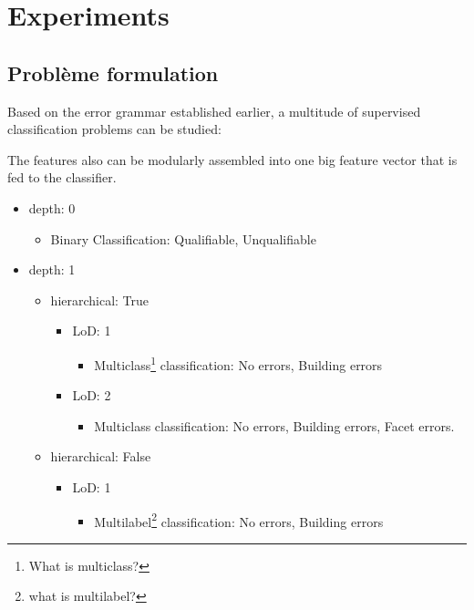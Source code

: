 \documentclass[../main.tex]{subfile}
\begin{document}
    \section{Experiments}
    
    \subsection{Problème formulation}

    Based on the error grammar established earlier, a multitude of supervised classification problems can be studied:


    The features also can be modularly assembled into one big feature vector that is fed to the classifier.

    \begin{itemize}
        \item depth: 0
        \begin{itemize}
            \item Binary Classification: Qualifiable, Unqualifiable
        \end{itemize}
        \item depth: 1
        \begin{itemize}
            \item hierarchical: True
            \begin{itemize}
                \item LoD\@: 1
                \begin{itemize}
                    \item Multiclass\footnote{What is multiclass?} classification: No errors, Building errors
                \end{itemize}
                \item LoD\@: 2
                \begin{itemize}
                    \item Multiclass classification: No errors, Building errors, Facet errors.
                \end{itemize}
            \end{itemize}
            \item hierarchical: False
            \begin{itemize}
                \item LoD\@: 1
                \begin{itemize}
                    \item Multilabel\footnote{what is multilabel?} classification: No errors, Building errors

\end{itemize}
\end{itemize}
\end{itemize}
\end{itemize}
\end{document}
